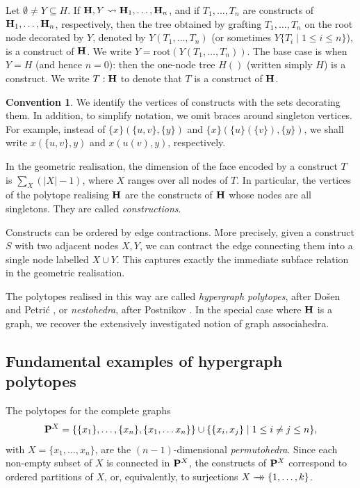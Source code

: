 \documentclass{article}
\theoremstyle{plain}
\theoremstyle{definition}
\newtheorem{convention}[thm]{Convention}
\newcommand{\set}[1]{\{#1\}}
\newcommand{\setc}[2]{\set{#1 \mid #2}}
\newcommand{\hyper}[1]{{\bf #1}}
\newcommand{\doublearrow}[1]{\xrightarrow[]{#1}\mathrel{\mkern-14mu}\rightarrow}
\begin{document}
\smallskip

Let  $\emptyset\neq Y\subseteq H$. If   $\hyper{H},Y  \leadsto \hyper{H}_1,\ldots, \hyper{H}_n$, and if  $T_1,\ldots,T_n$ are constructs of $\hyper{H}_1,\ldots,\hyper{H}_n$, respectively, then the tree obtained by grafting $T_1,\ldots,T_n$ on the root node decorated by $Y$, denoted by $Y(T_1,\ldots,T_n)$ (or sometimes $Y\setc{T_i}{1\leq i\leq n}$), is a construct of  $\hyper{H}$. We write $Y=\mbox{root}(Y(T_1,\ldots,T_n))$. 
 The base case is when $Y=H$ (and hence $n=0$): then the one-node tree $H()$ (written simply $H$) is a construct.
We write $T:\hyper{H}$ to denote that $T$ is a construct of $\hyper{H}$.  


\begin{convention}
We   identify the vertices of constructs with the sets decorating them. In addition, to simplify notation, we omit braces around singleton vertices. For example, instead of 
$\{x\}(\{u,v\},\{y\})$   and  $\{x\}(\{u\}(\{v\}),\{y\})$, we shall write $x(\{u,v\},y)$ and $x(u(v),y)$, respectively.
\end{convention}

In the geometric realisation, the dimension of the face encoded by a construct $T$ is  $\sum_X (|X|-1)$, where
$X$ ranges over all nodes of $T$. In particular, the vertices of the polytope realising $\hyper{H}$ are the constructs of $\hyper{H}$ whose nodes are all singletons. They are called \emph{constructions}.

\smallskip

Constructs can be ordered by edge contractions. More precisely, given a construct $S$ with two adjacent nodes 
$X,Y$, we can contract the edge connecting them into a single node labelled $X\cup Y$. This captures exactly the immediate subface relation in the geometric realisation. 

\smallskip

The polytopes realised in this way are  called \emph{hypergraph polytopes}, after Do\v sen and Petri\' c \cite{DP}, or \emph{nestohedra},  after Postnikov \cite{P09}.  
In the special case where $\hyper{H}$ is a graph,  we recover the extensively investigated notion of graph associahedra. 

\subsection{Fundamental examples of hypergraph polytopes} \label{fundamental-examples-section}

 
\smallskip
The polytopes for the complete graphs
$$\hyper{P}^X= \set{\set{x_1},\ldots,\set{x_n},\set{x_1,\ldots x_n}} \cup \setc{\set{x_i,x_j}}{1\leq i\neq j\leq n},$$
with  $X=\set{x_1,\ldots,x_n}$, are the $(n-1)$-dimensional \emph{permutohedra}. Since each non-empty subset of $X$ is connected in $\hyper{P}^X$, the constructs of $\hyper{P}^X$ correspond to ordered partitions of $X$, or, equivalently,  to surjections $X\doublearrow{}\{1,\dots,k\}$.
\end{document}
